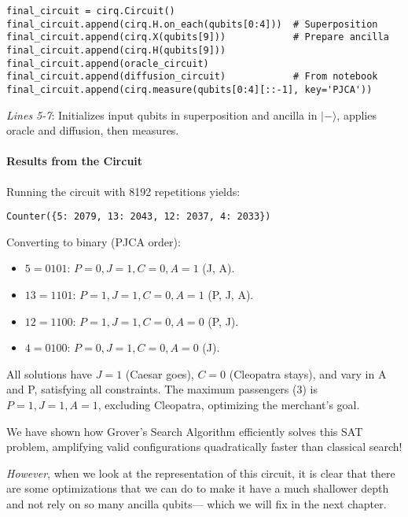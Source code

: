 \begin{verbatim}
final_circuit = cirq.Circuit()
final_circuit.append(cirq.H.on_each(qubits[0:4]))  # Superposition
final_circuit.append(cirq.X(qubits[9]))            # Prepare ancilla
final_circuit.append(cirq.H(qubits[9]))
final_circuit.append(oracle_circuit)
final_circuit.append(diffusion_circuit)            # From notebook
final_circuit.append(cirq.measure(qubits[0:4][::-1], key='PJCA'))
\end{verbatim}

\textit{Lines 5-7}: Initializes input qubits in superposition and ancilla in
$|-\rangle$, applies oracle and diffusion, then measures.

\paragraph{Results from the Circuit}\label{par:Results from the Circuit}
Running the circuit with 8192 repetitions yields:

\begin{verbatim}
Counter({5: 2079, 13: 2043, 12: 2037, 4: 2033})
\end{verbatim}

\noindent
Converting to binary (PJCA order):

\begin{itemize}
  \item $5 = 0101$: $P=0, J=1, C=0, A=1$ (J, A).
  \item $13 = 1101$: $P=1, J=1, C=0, A=1$ (P, J, A).
  \item $12 = 1100$: $P=1, J=1, C=0, A=0$ (P, J).
  \item $4 = 0100$: $P=0, J=1, C=0, A=0$ (J).
\end{itemize}

All solutions have $J=1$ (Caesar goes), $C=0$ (Cleopatra stays), and vary in
A and P, satisfying all constraints. The maximum passengers (3) is $P=1, J=1,
A=1$, excluding Cleopatra, optimizing the merchant’s goal.

We have shown how Grover’s Search Algorithm efficiently solves this SAT
problem, amplifying valid configurations quadratically faster than classical
search!

\emph{However}, when we look at the representation of this circuit, it is
clear that there are some optimizations that we can do to make it have a much
shallower depth and not rely on so many ancilla qubits--- which we will fix
in the next chapter.

